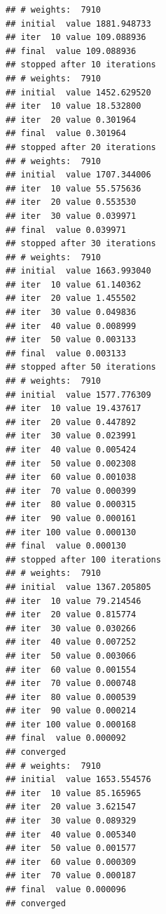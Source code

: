 \documentclass[
]{article}
\begin{document}
\begin{verbatim}
## # weights:  7910
## initial  value 1881.948733 
## iter  10 value 109.088936
## final  value 109.088936 
## stopped after 10 iterations
## # weights:  7910
## initial  value 1452.629520 
## iter  10 value 18.532800
## iter  20 value 0.301964
## final  value 0.301964 
## stopped after 20 iterations
## # weights:  7910
## initial  value 1707.344006 
## iter  10 value 55.575636
## iter  20 value 0.553530
## iter  30 value 0.039971
## final  value 0.039971 
## stopped after 30 iterations
## # weights:  7910
## initial  value 1663.993040 
## iter  10 value 61.140362
## iter  20 value 1.455502
## iter  30 value 0.049836
## iter  40 value 0.008999
## iter  50 value 0.003133
## final  value 0.003133 
## stopped after 50 iterations
## # weights:  7910
## initial  value 1577.776309 
## iter  10 value 19.437617
## iter  20 value 0.447892
## iter  30 value 0.023991
## iter  40 value 0.005424
## iter  50 value 0.002308
## iter  60 value 0.001038
## iter  70 value 0.000399
## iter  80 value 0.000315
## iter  90 value 0.000161
## iter 100 value 0.000130
## final  value 0.000130 
## stopped after 100 iterations
## # weights:  7910
## initial  value 1367.205805 
## iter  10 value 79.214546
## iter  20 value 0.815774
## iter  30 value 0.030266
## iter  40 value 0.007252
## iter  50 value 0.003066
## iter  60 value 0.001554
## iter  70 value 0.000748
## iter  80 value 0.000539
## iter  90 value 0.000214
## iter 100 value 0.000168
## final  value 0.000092 
## converged
## # weights:  7910
## initial  value 1653.554576 
## iter  10 value 85.165965
## iter  20 value 3.621547
## iter  30 value 0.089329
## iter  40 value 0.005340
## iter  50 value 0.001577
## iter  60 value 0.000309
## iter  70 value 0.000187
## final  value 0.000096 
## converged
\end{verbatim}
\end{document}
